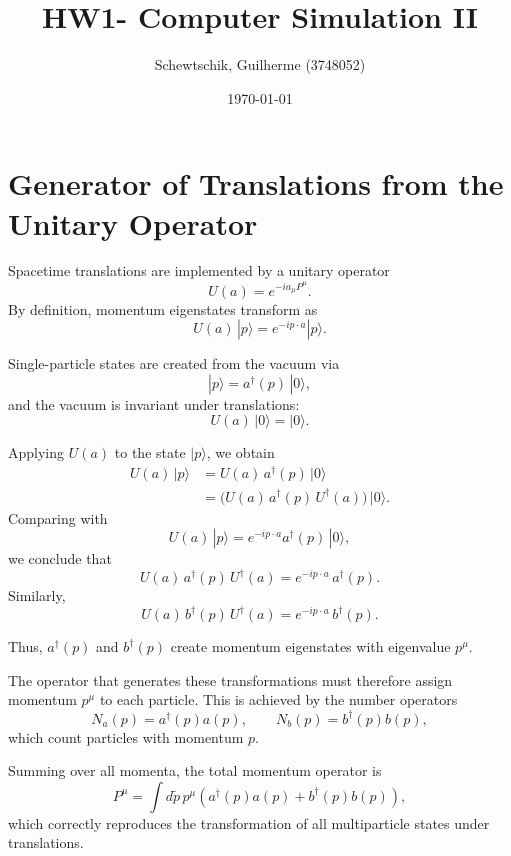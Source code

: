 \documentclass[a4paper]{article}
\title{HW1- Computer Simulation II}
\author{Schewtschik, Guilherme  (3748052)}
\date{\today}
\begin{document}
\section{Generator of Translations from the Unitary Operator}

Spacetime translations are implemented by a unitary operator
\begin{equation}
U(a) = e^{-i a_\mu P^\mu}.
\end{equation}
By definition, momentum eigenstates transform as
\begin{equation}
U(a)\,|p\rangle = e^{-i p \cdot a} |p\rangle.
\end{equation}

Single-particle states are created from the vacuum via
\begin{equation}
|p\rangle = a^\dagger(p)\,|0\rangle,
\end{equation}
and the vacuum is invariant under translations:
\begin{equation}
U(a)\,|0\rangle = |0\rangle.
\end{equation}

Applying $U(a)$ to the state $|p\rangle$, we obtain
\begin{align}
U(a)\,|p\rangle 
&= U(a)\,a^\dagger(p)\,|0\rangle \\
&= \bigl(U(a)\,a^\dagger(p)\,U^\dagger(a)\bigr)\,|0\rangle.
\end{align}
Comparing with
\begin{equation}
U(a)\,|p\rangle = e^{-i p \cdot a} a^\dagger(p)\,|0\rangle,
\end{equation}
we conclude that
\begin{equation}
U(a)\,a^\dagger(p)\,U^\dagger(a) = e^{-i p \cdot a}\,a^\dagger(p).
\end{equation}
Similarly,
\begin{equation}
U(a)\,b^\dagger(p)\,U^\dagger(a) = e^{-i p \cdot a}\,b^\dagger(p).
\end{equation}

Thus, $a^\dagger(p)$ and $b^\dagger(p)$ create momentum eigenstates with eigenvalue $p^\mu$.

The operator that generates these transformations must therefore assign momentum $p^\mu$ to each particle. This is achieved by the number operators
\begin{equation}
N_a(p) = a^\dagger(p)a(p), \qquad
N_b(p) = b^\dagger(p)b(p),
\end{equation}
which count particles with momentum $p$.

Summing over all momenta, the total momentum operator is
\begin{equation}
P^\mu = \int d\tilde{p}\, p^\mu 
\left( a^\dagger(p)a(p) + b^\dagger(p)b(p) \right),
\end{equation}
which correctly reproduces the transformation of all multiparticle states under translations.
\end{document}

